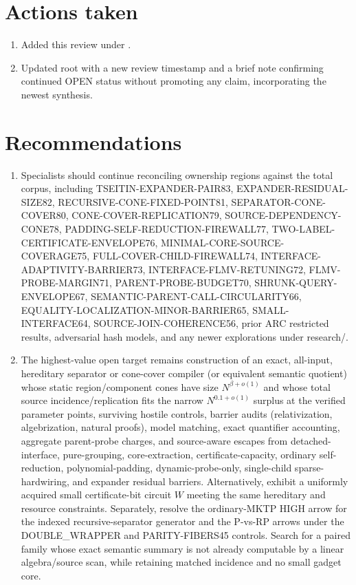 \documentclass[11pt]{article}
\begin{document}
\section{Actions taken}
\begin{enumerate}
\item Added this review under .
\item Updated root  with a new review timestamp and a brief note confirming continued OPEN status without promoting any claim, incorporating the newest synthesis.
\end{enumerate}

\section{Recommendations}
\begin{enumerate}
\item Specialists should continue reconciling ownership regions against the total corpus, including TSEITIN-EXPANDER-PAIR83, EXPANDER-RESIDUAL-SIZE82, RECURSIVE-CONE-FIXED-POINT81, SEPARATOR-CONE-COVER80, CONE-COVER-REPLICATION79, SOURCE-DEPENDENCY-CONE78, PADDING-SELF-REDUCTION-FIREWALL77, TWO-LABEL-CERTIFICATE-ENVELOPE76, MINIMAL-CORE-SOURCE-COVERAGE75, FULL-COVER-CHILD-FIREWALL74, INTERFACE-ADAPTIVITY-BARRIER73, INTERFACE-FLMV-RETUNING72, FLMV-PROBE-MARGIN71, PARENT-PROBE-BUDGET70, SHRUNK-QUERY-ENVELOPE67, SEMANTIC-PARENT-CALL-CIRCULARITY66, EQUALITY-LOCALIZATION-MINOR-BARRIER65, SMALL-INTERFACE64, SOURCE-JOIN-COHERENCE56, prior ARC restricted results, adversarial hash models, and any newer explorations under research/.
\item The highest-value open target remains construction of an exact, all-input, hereditary separator or cone-cover compiler (or equivalent semantic quotient) whose static region/component cones have size $N^{\beta+o(1)}$ and whose total source incidence/replication fits the narrow $N^{0.1+o(1)}$ surplus at the verified parameter points, surviving hostile controls, barrier audits (relativization, algebrization, natural proofs), model matching, exact quantifier accounting, aggregate parent-probe charges, and source-aware escapes from detached-interface, pure-grouping, core-extraction, certificate-capacity, ordinary self-reduction, polynomial-padding, dynamic-probe-only, single-child sparse-hardwiring, and expander residual barriers. Alternatively, exhibit a uniformly acquired small certificate-bit circuit $W$ meeting the same hereditary and resource constraints. Separately, resolve the ordinary-MKTP HIGH arrow for the indexed recursive-separator generator and the P-vs-RP arrows under the DOUBLE_WRAPPER and PARITY-FIBERS45 controls. Search for a paired family whose exact semantic summary is not already computable by a linear algebra/source scan, while retaining matched incidence and no small gadget core.

\end{enumerate}
\end{document}
